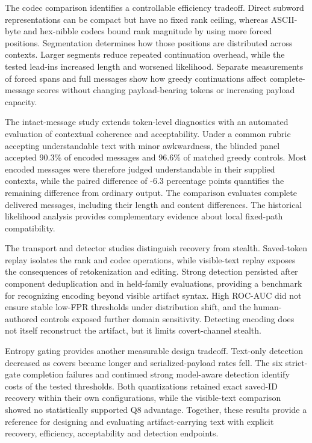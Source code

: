 \documentclass[fleqn,10pt]{wlscirep}
\begin{document}
The codec comparison identifies a controllable efficiency tradeoff. Direct subword representations can be compact but have no fixed rank ceiling, whereas ASCII-byte and hex-nibble codecs bound rank magnitude by using more forced positions. Segmentation determines how those positions are distributed across contexts. Larger segments reduce repeated continuation overhead, while the tested lead-ins increased length and worsened likelihood. Separate measurements of forced spans and full messages show how greedy continuations affect complete-message scores without changing payload-bearing tokens or increasing payload capacity.

The intact-message study extends token-level diagnostics with an automated evaluation of contextual coherence and acceptability. Under a common rubric accepting understandable text with minor awkwardness, the blinded panel accepted 90.3\% of encoded messages and 96.6\% of matched greedy controls. Most encoded messages were therefore judged understandable in their supplied contexts, while the paired difference of -6.3 percentage points quantifies the remaining difference from ordinary output. The comparison evaluates complete delivered messages, including their length and content differences. The historical likelihood analysis provides complementary evidence about local fixed-path compatibility.

The transport and detector studies distinguish recovery from stealth. Saved-token replay isolates the rank and codec operations, while visible-text replay exposes the consequences of retokenization and editing. Strong detection persisted after component deduplication and in held-family evaluations, providing a benchmark for recognizing encoding beyond visible artifact syntax. High ROC-AUC did not ensure stable low-FPR thresholds under distribution shift, and the human-authored controls exposed further domain sensitivity. Detecting encoding does not itself reconstruct the artifact, but it limits covert-channel stealth.

Entropy gating provides another measurable design tradeoff. Text-only detection decreased as covers became longer and serialized-payload rates fell. The six strict-gate completion failures and continued strong model-aware detection identify costs of the tested thresholds. Both quantizations retained exact saved-ID recovery within their own configurations, while the visible-text comparison showed no statistically supported Q8 advantage. Together, these results provide a reference for designing and evaluating artifact-carrying text with explicit recovery, efficiency, acceptability and detection endpoints.
\end{document}
